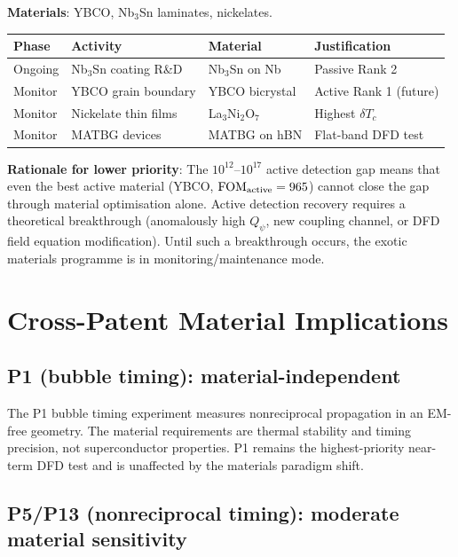 \documentclass[11pt]{article}
\theoremstyle{definition}
\theoremstyle{remark}
\newcommand{\Qpsi}{Q_\psi}
\newcommand{\FOMactive}{\mathrm{FOM}_{\rm active}}
\begin{document}
\textbf{Materials}: YBCO, Nb$_3$Sn laminates, nickelates.

\begin{center}
\renewcommand{\arraystretch}{1.3}
\begin{tabular}{p{2cm}p{3cm}p{3cm}p{3cm}}
\toprule
Phase & Activity & Material & Justification \\
\midrule
Ongoing & Nb$_3$Sn coating R\&D & Nb$_3$Sn on Nb & Passive Rank 2 \\
Monitor & YBCO grain boundary & YBCO bicrystal & Active Rank 1 (future) \\
Monitor & Nickelate thin films & La$_3$Ni$_2$O$_7$ & Highest $\delta T_c$ \\
Monitor & MATBG devices & MATBG on hBN & Flat-band DFD test \\
\bottomrule
\end{tabular}
\end{center}

\textbf{Rationale for lower priority}: The $10^{12}$--$10^{17}$ active
detection gap means that even the best active material (YBCO,
$\FOMactive = 965$) cannot close the gap through material optimisation
alone. Active detection recovery requires a theoretical breakthrough
(anomalously high $\Qpsi$, new coupling channel, or DFD field equation
modification). Until such a breakthrough occurs, the exotic materials
programme is in monitoring/maintenance mode.


\section{Cross-Patent Material Implications}
\label{sec:cross_patent}

\subsection{P1 (bubble timing): material-independent}

The P1 bubble timing experiment measures nonreciprocal propagation
in an EM-free geometry. The material requirements are thermal stability
and timing precision, not superconductor properties. P1 remains the
highest-priority near-term DFD test and is unaffected by the materials
paradigm shift.

\subsection{P5/P13 (nonreciprocal timing): moderate material sensitivity}
\end{document}
